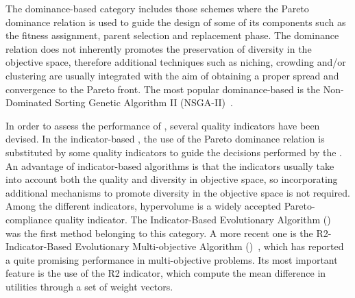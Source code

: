 The dominance-based category includes those schemes where the Pareto dominance relation is used to guide the 
design of some of its components such as the fitness assignment, parent selection and replacement phase.
%
The dominance relation does not inherently promotes the preservation of diversity in the objective space, 
therefore additional techniques such as niching, crowding and/or clustering are usually integrated with the aim of 
obtaining a proper spread and convergence to the Pareto front.
%
The most popular dominance-based \MOEA{} is the Non-Dominated Sorting Genetic Algorithm II (NSGA-II)~\cite{Joel:NSGAII}.
%

In order to assess the performance of \MOEAS{}, several quality indicators have been devised.
%
In the indicator-based \MOEAS{}, the use of the Pareto dominance relation is substituted by some quality indicators 
to guide the decisions performed by the \MOEA{}.
%
An advantage of indicator-based algorithms is that the indicators usually take into account both the quality and 
diversity in objective space, so incorporating additional mechanisms to promote diversity in the objective 
space is not required.
%
Among the different indicators, hypervolume is a widely accepted Pareto-compliance quality indicator.
%
The Indicator-Based Evolutionary Algorithm (\IBEA{})~\cite{Joel:IBEA} was the first method belonging to this category.
%
A more recent one is the R2-Indicator-Based Evolutionary Multi-objective Algorithm (\RMOEA{})~\cite{trautmann2013r2}, 
%
%
which has reported a quite promising performance in multi-objective problems.
%
%
%
Its most important feature is the use of the R2 indicator, which compute the mean difference in utilities through a set of weight vectors.
%

